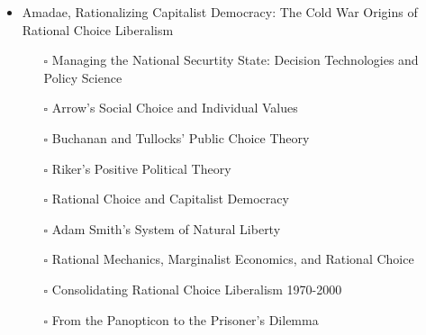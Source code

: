 \documentclass[paper=B6,portrait,twoside=true,twocolumn=false,headinclude=true,footinclude=false,fontsize=12,BCOR=10mm,DIV=calc,pagesize=auto,titlepage=firstiscover,mpinclude=false,headings=normal,headings=twolinechapter,open=right,toc=graduated,chapterprefix=false,numbers=endperiod,parskip=half+]{scrbook}
\theoremstyle{definition}
\begin{document}
\begin{itemize}
\item\relax [0/9] Amadae, Rationalizing Capitalist Democracy: The Cold War Origins of
Rational Choice Liberalism
\begin{itemize}
\item[{$\square$}] Managing the National Securtity State: Decision Technologies and Policy Science
\item[{$\square$}] Arrow's Social Choice and Individual Values
\item[{$\square$}] Buchanan and Tullocks' Public Choice Theory
\item[{$\square$}] Riker's Positive Political Theory
\item[{$\square$}] Rational Choice and Capitalist Democracy
\item[{$\square$}] Adam Smith's System of Natural Liberty
\item[{$\square$}] Rational Mechanics, Marginalist Economics, and Rational Choice
\item[{$\square$}] Consolidating Rational Choice Liberalism 1970-2000
\item[{$\square$}] From the Panopticon to the Prisoner's Dilemma
\end{itemize}
\end{itemize}
\end{document}
